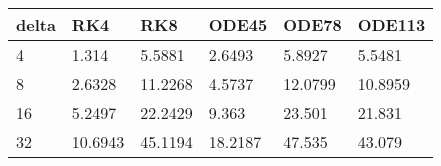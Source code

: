 \begin{tabular}{llllll}
delta & RK4 & RK8 & ODE45 & ODE78 & ODE113 \\ 
\hline 
4 & 1.314 & 5.5881 & 2.6493 & 5.8927 & 5.5481 \\ 
8 & 2.6328 & 11.2268 & 4.5737 & 12.0799 & 10.8959 \\ 
16 & 5.2497 & 22.2429 & 9.363 & 23.501 & 21.831 \\ 
32 & 10.6943 & 45.1194 & 18.2187 & 47.535 & 43.079 \\ 
\hline 
\end{tabular}